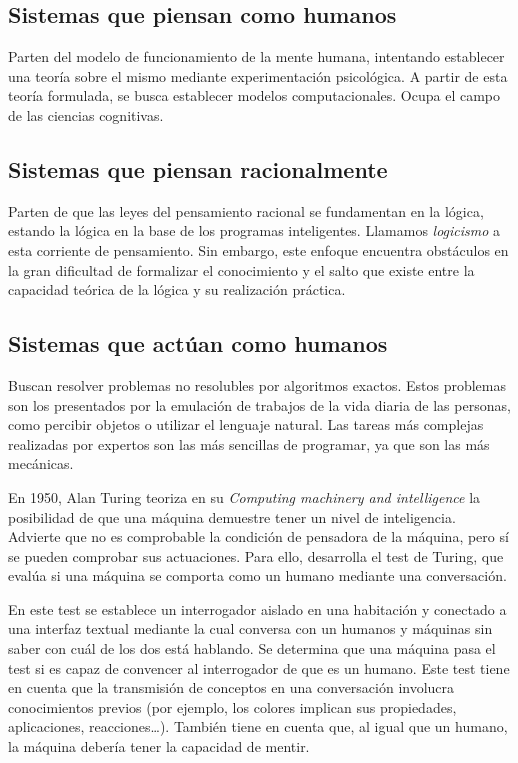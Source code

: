 \subsection{Sistemas que piensan como humanos}

Parten del modelo de funcionamiento de la mente humana, intentando establecer una teoría sobre el mismo mediante experimentación psicológica.
A partir de esta teoría formulada, se busca establecer modelos computacionales.
Ocupa el campo de las ciencias cognitivas.

\subsection{Sistemas que piensan racionalmente}

Parten de que las leyes del pensamiento racional se fundamentan en la lógica, estando la lógica en la base de los programas inteligentes.
Llamamos \textit{logicismo} a esta corriente de pensamiento.
Sin embargo, este enfoque encuentra obstáculos en la gran dificultad de formalizar el conocimiento y el salto que existe entre la capacidad teórica de la lógica y su realización práctica.

\subsection{Sistemas que actúan como humanos}

Buscan resolver problemas no resolubles por algoritmos exactos.
Estos problemas son los presentados por la emulación de trabajos de la vida diaria de las personas, como percibir objetos o utilizar el lenguaje natural.
Las tareas más complejas realizadas por expertos son las más sencillas de programar, ya que son las más mecánicas.

En 1950, Alan Turing teoriza en su \textit{Computing machinery and intelligence} la posibilidad de que una máquina demuestre tener un nivel de inteligencia.
Advierte que no es comprobable la condición de pensadora de la máquina, pero sí se pueden comprobar sus actuaciones.
Para ello, desarrolla el test de Turing, que evalúa si una máquina se comporta como un humano mediante una conversación.

En este test se establece un interrogador aislado en una habitación y conectado a una interfaz textual mediante la cual conversa con un humanos y máquinas sin saber con cuál de los dos está hablando.
Se determina que una máquina pasa el test si es capaz de convencer al interrogador de que es un humano.
Este test tiene en cuenta que la transmisión de conceptos en una conversación involucra conocimientos previos (por ejemplo, los colores implican sus propiedades, aplicaciones, reacciones\ldots).
También tiene en cuenta que, al igual que un humano, la máquina debería tener la capacidad de mentir.

